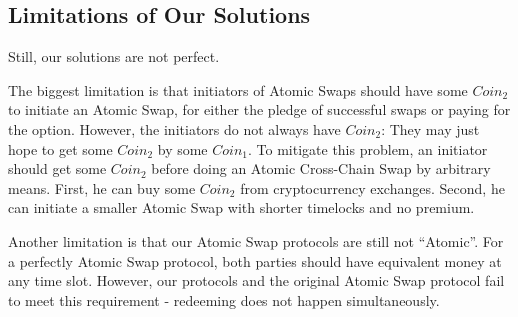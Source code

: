 \subsection{Limitations of Our Solutions}

Still, our solutions are not perfect.

The biggest limitation is that initiators of Atomic Swaps should have some $Coin_2$ to initiate an Atomic Swap,
for either the pledge of successful swaps or paying for the option.
However, the initiators do not always have $Coin_2$: They may just hope to get some $Coin_2$ by some $Coin_1$.
To mitigate this problem, an initiator should get some $Coin_2$ before doing an Atomic Cross-Chain Swap by arbitrary means.
First, he can buy some $Coin_2$ from cryptocurrency exchanges.
Second, he can initiate a smaller Atomic Swap with shorter timelocks and no premium.

Another limitation is that our Atomic Swap protocols are still not ``Atomic''.
For a perfectly Atomic Swap protocol, both parties should have equivalent money at any time slot.
However, our protocols and the original Atomic Swap protocol fail to meet this requirement - redeeming does not happen simultaneously. 